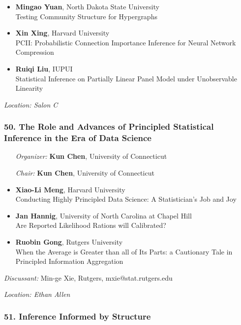 \begin{itemize}
\item \textbf{Mingao Yuan}, North Dakota State University \\
Testing Community Structure for Hypergraphs
\item \textbf{Xin Xing}, Harvard University \\
PCII: Probabilistic Connection Importance Inference for Neural Network Compression
\item \textbf{Ruiqi Liu}, IUPUI \\
Statistical Inference on Partially Linear Panel Model under Unobservable Linearity
\end{itemize}

\emph{Location: Salon C}

\subsubsection*{50. The Role and Advances of Principled Statistical Inference in the Era of Data Science}

\begin{enumerate}[align=left]
\item [\emph{Organizer:}] \textbf{Kun Chen}, University of Connecticut
\item [\emph{Chair:}] \textbf{Kun Chen}, University of Connecticut
\end{enumerate}

\begin{itemize}
\item \textbf{Xiao-Li Meng}, Harvard University \\
Conducting Highly Principled Data Science: A Statistician's Job and Joy
\item \textbf{Jan Hannig}, University of North Carolina at Chapel Hill \\
Are Reported Likelihood Rations will Calibrated?
\item \textbf{Ruobin Gong}, Rutgers University \\
When the Average is Greater than all of Its Parts: a Cautionary Tale in Principled Information Aggregation
\end{itemize}

\emph{Discussant:} Min-ge Xie, Rutgers, mxie@stat.rutgers.edu

\emph{Location: Ethan Allen}

\subsubsection*{51. Inference Informed by Structure}

